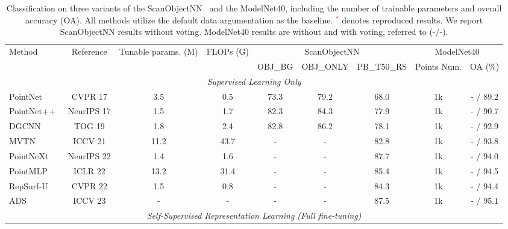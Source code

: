 \begin{table*}[ht]
    \footnotesize
    \setlength{\tabcolsep}{0.9mm}
    \centering

  \caption{
Classification on three variants of the ScanObjectNN~\cite{uy2019revisiting} and the ModelNet40\cite{wu20153d}, including the number of trainable parameters and overall accuracy (OA). All methods utilize the default data argumentation as the baseline\cite{zhou2024dynamic}. \textcolor{red}{$^*$} denotes reproduced results. We report ScanObjectNN\cite{uy2019revisiting} results without voting. ModelNet40\cite{wu20153d} results are without and with voting, referred to (-/-).
}
  \vspace{-10pt}
    \begin{tabular}{lcccccccc}
    
    \toprule
    \multirow{2.3}{*}{Method} &\multirow{2.3}{*}{Reference} &\multirow{2.3}{*}{Tunable params. (M)} &\multirow{2.3}{*}{FLOPs (G)} &\multicolumn{3}{c}{ScanObjectNN} &\multicolumn{2}{c}{ModelNet40}\\
		\cmidrule(r){5-7} \cmidrule{8-9}
	& & & &OBJ\_BG & OBJ\_ONLY &PB\_T50\_RS & Points Num. & OA (\%)      \\
    \midrule
    \multicolumn{9}{c}{\textit{Supervised Learning Only}} \\
    \midrule
    PointNet~\cite{qi2017pointnet} & CVPR 17 & 3.5 & 0.5  & 73.3  & 79.2  & 68.0 & 1k & - / 89.2 \\
    PointNet++~\cite{qi2017pointnet++}   & NeurIPS 17 & 1.5 & 1.7 & 82.3  & 84.3  & 77.9 & 1k & - / 90.7\\
    DGCNN~\cite{wang2019dynamic}  & TOG 19 & 1.8 & 2.4 & 82.8  & 86.2  & 78.1 & 1k & - / 92.9 \\
    MVTN~\cite{hamdi2021mvtn}  & ICCV 21 & 11.2 & 43.7 & -     & -     & 82.8 & 1k & - / 93.8\\
    PointNeXt~\cite{qian2022pointnext} & NeurIPS 22  & 1.4 & 1.6 & -     & -  & 87.7 & 1k & - / 94.0\\
    PointMLP~\cite{ma2022rethinking}  & ICLR 22 &  13.2 & 31.4  & -    & -     & 85.4  & 1k & - / 94.5\\
    RepSurf-U~\cite{ran2022surface} & CVPR 22 & 1.5   & 0.8 &  -  & -    & 84.3  & 1k  & - / 94.4 \\
    ADS~\cite{hong2023attention} & ICCV 23 & -  & -  &  - & -   & 87.5 & 1k  & - / 95.1 \\
    \midrule
    \multicolumn{9}{c}{\textit{ Self-Supervised Representation Learning (Full fine-tuning)}} \\

\end{tabular}
\end{table*}
